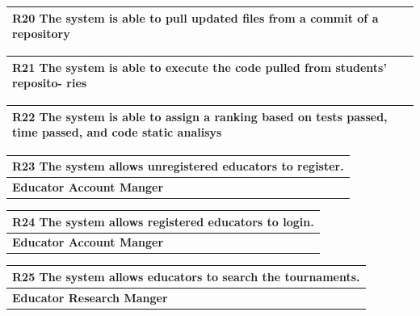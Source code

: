 \documentclass[12pt, a4paper]{report}
\begin{document}
\begin{table}[H]
    \begin{tabularx}{\textwidth}{X}
    \textbf{R20} The system is able to pull updated files from a commit of a repository\\
    \hline 
    \end{tabularx}
\end{table}

\begin{table}[H]
    \begin{tabularx}{\textwidth}{X}
    \textbf{R21} The system is able to execute the code pulled from students’ reposito-
    ries\\
    \hline 
    \end{tabularx}
\end{table}

\begin{table}[H]
    \begin{tabularx}{\textwidth}{X}
    \textbf{R22} The system is able to assign a ranking based on tests passed, time
    passed, and code static analisys\\
    \hline 
    \end{tabularx}
\end{table}

\begin{table}[H]
    \begin{tabularx}{\textwidth}{X}
    \textbf{R23} The system allows unregistered educators to register.\\
    \hline 
    \textbf{Educator Account Manger}
\end{tabularx}
\end{table}

\begin{table}[H]
    \begin{tabularx}{\textwidth}{X}
    \textbf{R24} The system allows registered educators to login.\\
    \hline 
    \textbf{Educator Account Manger}
\end{tabularx}
\end{table}

\begin{table}[H]
    \begin{tabularx}{\textwidth}{X}
    \textbf{R25} The system allows educators to search the tournaments.\\
    \hline 
    \textbf{Educator Research Manger}
\end{tabularx}
\end{table}
\end{document}
